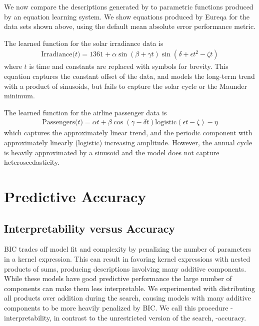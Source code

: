 We now compare the descriptions generated by \procedurename{} to parametric functions produced by an equation learning system.
We show equations produced by Eureqa \citep{Eureqa} for the data sets shown above, using the default mean absolute error performance metric.

The learned function for the solar irradiance data is
\begin{align*}
\textrm{Irradiance($t$)} = 1361 + \alpha\sin(\beta + \gamma t)\sin(\delta + \epsilon t^2 - \zeta t)
\end{align*}
where $t$ is time and constants are replaced with symbols for brevity.
This equation captures the constant offset of the data, and models the long-term trend with a product of sinusoids, but fails to capture the solar cycle or the Maunder minimum.

The learned function for the airline passenger data is
\begin{align*}
\textrm{Passengers($t$)} = \alpha t + \beta\cos(\gamma - \delta t)\textrm{logistic}(\epsilon t - \zeta) - \eta
\end{align*}
which captures the approximately linear trend, and the periodic component with approximately linearly (logistic) increasing amplitude.
However, the annual cycle is heavily approximated by a sinusoid and the model does not capture heteroscedasticity.





\section{Predictive Accuracy}
\label{sec:numerical}


\subsection{Interpretability versus Accuracy}

BIC trades off model fit and complexity by penalizing the number of parameters in a kernel expression.
This can result in \procedurename{} favoring kernel expressions with nested products of sums, producing descriptions involving many additive components.
While these models have good predictive performance the large number of components can make them less interpretable.
We experimented with distributing all products over addition during the search, causing models with many additive components to be more heavily penalized by BIC.
We call this procedure \procedurename{}-interpretability, in contrast to the unrestricted version of the search, \procedurename{}-accuracy.



